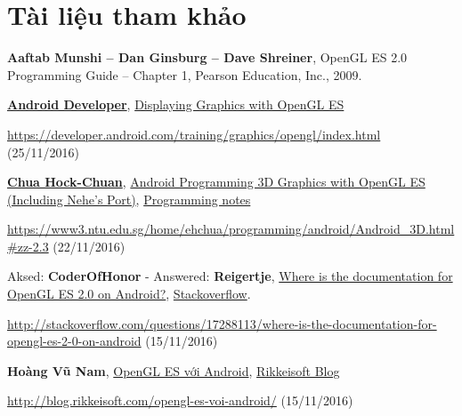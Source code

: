 \documentclass[13pt,a4paper]{extreport}
\begin{document}
\chapter*{Tài liệu tham khảo}
\vspace*{-10pt}
	\begin{enumerate}[{[1]}]
		\item \textbf{Aaftab Munshi -- Dan Ginsburg -- Dave Shreiner}, OpenGL ES 2.0 Programming Guide -- Chapter 1, Pearson Education, Inc., 2009.
		
		\item \href{https://developer.android.com/index.html}{\textbf{Android Developer}}, \href{https://developer.android.com/training/graphics/opengl/index.html}{Displaying Graphics with OpenGL ES}
		
			\href{https://developer.android.com/training/graphics/opengl/index.html}{https://developer.android.com/training/graphics/opengl/index.html} (25/11/2016)
		
		\item \href{ehchua@ntu.edu.sg}{\textbf{Chua Hock-Chuan}}, \href{https://www3.ntu.edu.sg/home/ehchua/programming/android/Android_3D.html#zz-2.3}{Android Programming 3D Graphics with OpenGL ES (Including Nehe's Port)}, \href{https://www3.ntu.edu.sg/home/ehchua/programming/index.html}{Programming notes}
			
			\href{https://www3.ntu.edu.sg/home/ehchua/programming/android/Android_3D.html#zz-2.3}{https://www3.ntu.edu.sg/home/ehchua/programming/android/Android\_3D.html\#zz-2.3} (22/11/2016)		
			
		\item Aksed: \textbf{CoderOfHonor} - Answered: \textbf{Reigertje}, \href{http://stackoverflow.com/questions/17288113/where-is-the-documentation-for-opengl-es-2-0-on-android}{Where is the documentation for OpenGL ES 2.0 on Android?}, \href{http://stackoverflow.com/}{Stackoverflow}.
		
			\href{http://stackoverflow.com/questions/17288113/where-is-the-documentation-for-opengl-es-2-0-on-android}{http://stackoverflow.com/questions/17288113/where-is-the-documentation-for-opengl-es-2-0-on-android} (15/11/2016)
		
		\item \textbf{Hoàng Vũ Nam}, \href{http://blog.rikkeisoft.com/opengl-es-voi-android/}{OpenGL ES với Android}, \href{http://blog.rikkeisoft.com/}{Rikkeisoft Blog}
		
			\href{http://blog.rikkeisoft.com/opengl-es-voi-android/}{http://blog.rikkeisoft.com/opengl-es-voi-android/} (15/11/2016)
		

\end{enumerate}
\end{document}
